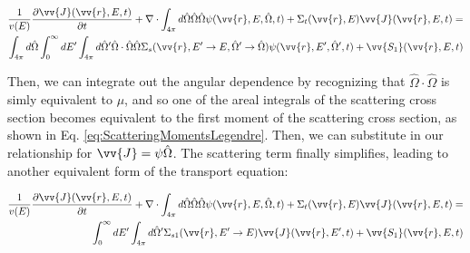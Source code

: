 \documentclass[10pt]{article}
\begin{document}
\begin{flushleft}
\begin{equation}
\label{eq:TEAngleAngleIntegrated}
\begin{aligned}
\frac{1}{v(E)} \frac{\partial\vv{J}(\vv{r}, E, t)}{\partial t} +
 \nabla\cdot \int_{4\pi}^{} d\hat{\Omega} \hat{\Omega}\hat{\Omega}\psi(\vv{r}, E, \hat{\Omega},t) + 
 \Sigma_t(\vv{r},E)\vv{J}(\vv{r}, E, t) = \\
 \int_{4\pi}^{} d\hat{\Omega} \int_{0}^{\infty}dE' \int_{4\pi}^{ } d\hat{\Omega}' \hat{\Omega}\cdot\hat{\Omega} \hat{\Omega}\Sigma_s(\vv{r}, E'\rightarrow E, \hat{\Omega}'\rightarrow\hat{\Omega})\psi(\vv{r}, E', \hat{\Omega}',t) + \vv{S_1}(\vv{r}, E, t)\\
\end{aligned}
\end{equation}



Then, we can integrate out the angular dependence by recognizing that \(\hat{\Omega}\cdot\hat{\Omega}\) is simly equivalent to \(\mu\), and so one of the areal integrals of the scattering cross section becomes equivalent to the first moment of the scattering cross section, as shown in Eq. \ref{eq:ScatteringMomentsLegendre}. Then, we can substitute in our relationship for \(\vv{J} = \psi\hat{\Omega}\). The scattering term finally simplifies, leading to another equivalent form of the transport equation:

\begin{equation}
\label{eq:TEAngleAngleIntegrated2}
\begin{aligned}
\frac{1}{v(E)} \frac{\partial\vv{J}(\vv{r}, E, t)}{\partial t} +
 \nabla\cdot \int_{4\pi}^{} d\hat{\Omega} \hat{\Omega}\hat{\Omega}\psi(\vv{r}, E, \hat{\Omega},t) + 
 \Sigma_t(\vv{r},E)\vv{J}(\vv{r}, E, t) = \\
 \int_{0}^{\infty}dE' \int_{4\pi}^{ } d\hat{\Omega}' \Sigma_{s1}(\vv{r}, E'\rightarrow E)\vv{J}(\vv{r}, E', t) + \vv{S_1}(\vv{r}, E, t)\\
\end{aligned}
\end{equation}


\end{flushleft}
\end{document}
